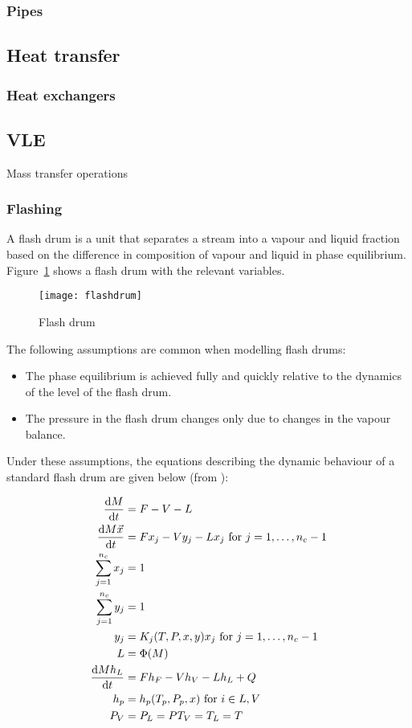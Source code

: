 \subsubsection{Pipes}


\subsection{Heat transfer}
\subsubsection{Heat exchangers}


\subsection{VLE}
Mass transfer operations 



\subsubsection{Flashing}
A flash drum is a unit that separates a stream into a vapour and
liquid fraction based on the difference in composition of vapour and
liquid in phase equilibrium.  Figure~\ref{fig:flashdrum} shows a flash
drum with the relevant variables.

\begin{figure}[htbp]
  \centering
  \texttt{[image: flashdrum]}
  \caption{Flash drum}
  \label{fig:flashdrum}
\end{figure}

The following assumptions are common when modelling flash drums:

\begin{itemize}
\item The phase equilibrium is achieved fully and quickly relative to
  the dynamics of the level of the flash drum.
\item The pressure in the flash drum changes only due to changes in
  the vapour balance.
\end{itemize}

Under these assumptions, the equations describing the dynamic
behaviour of a standard flash drum are given below (from \citet{mathflowsheeting}):

\begin{align}
  \frac{\mathrm{d}M}{\mathrm{d}t} &= F - V - L \\
  \frac{\mathrm{d}M\vec{x}}{\mathrm{d}t} &= Fx_j - Vy_j - Lx_j \text{ for } j = 1,\dots,n_c-1  \\
  \sum_{j=1}^{n_c} x_j &= 1 \\
  \sum_{j=1}^{n_c} y_j &= 1 \\
  y_j &= K_j(T, P, x, y)x_j \text{ for } j = 1,\dots,n_c-1  \\
  L &= \Phi(M) \\
  \frac{\mathrm{d}Mh_L}{\mathrm{d}t} &= Fh_F - Vh_V - Lh_L + Q \\
  h_p &= h_p(T_p, P_p, x) \text{ for } i \in {L, V} \\
  P_V &= P_L = P
  T_V=T_L=T
\end{align}

